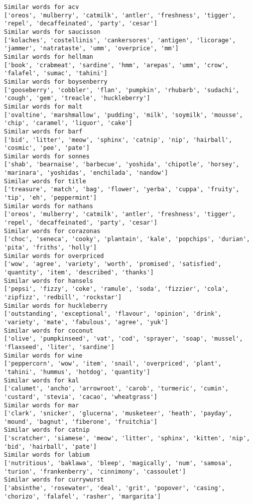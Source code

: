 \documentclass[11pt]{article}
\begin{document}
\begin{Verbatim}[commandchars=\\\{\}]
Similar words for acv
['oreos', 'mulberry', 'catmilk', 'antler', 'freshness', 'tigger', 'repel', 'decaffeinated', 'party', 'cesar']
Similar words for saucisson
['kolaches', 'costellinis', 'cankersores', 'antigen', 'licorage', 'jammer', 'natrataste', 'umm', 'overprice', 'mm']
Similar words for hellman
['book', 'crabmeat', 'sardine', 'hmm', 'arepas', 'umm', 'crow', 'falafel', 'sumac', 'tahini']
Similar words for boysenberry
['gooseberry', 'cobbler', 'flan', 'pumpkin', 'rhubarb', 'sudachi', 'cough', 'gem', 'treacle', 'huckleberry']
Similar words for malt
['ovaltine', 'marshmallow', 'pudding', 'milk', 'soymilk', 'mousse', 'chip', 'caramel', 'liquor', 'cake']
Similar words for barf
['bid', 'litter', 'meow', 'sphinx', 'catnip', 'nip', 'hairball', 'cosmic', 'pee', 'pate']
Similar words for sonnes
['shab', 'bearnaise', 'barbecue', 'yoshida', 'chipotle', 'horsey', 'marinara', 'yoshidas', 'enchilada', 'nandow']
Similar words for title
['treasure', 'match', 'bag', 'flower', 'yerba', 'cuppa', 'fruity', 'tip', 'eh', 'peppermint']
Similar words for nathans
['oreos', 'mulberry', 'catmilk', 'antler', 'freshness', 'tigger', 'repel', 'decaffeinated', 'party', 'cesar']
Similar words for corazonas
['choc', 'seneca', 'cooky', 'plantain', 'kale', 'popchips', 'durian', 'pita', 'friths', 'holly']
Similar words for overpriced
['wow', 'agree', 'variety', 'worth', 'promised', 'satisfied', 'quantity', 'item', 'described', 'thanks']
Similar words for hansels
['pepsi', 'fizzy', 'coke', 'ramule', 'soda', 'fizzier', 'cola', 'zipfizz', 'redbill', 'rockstar']
Similar words for huckleberry
['outstanding', 'exceptional', 'flavour', 'opinion', 'drink', 'variety', 'mate', 'fabulous', 'agree', 'yuk']
Similar words for coconut
['olive', 'pumpkinseed', 'vat', 'cod', 'sprayer', 'soap', 'mussel', 'flaxseed', 'liter', 'sardine']
Similar words for wine
['peppercorn', 'wow', 'item', 'snail', 'overpriced', 'plant', 'tahini', 'hummus', 'hotdog', 'quantity']
Similar words for kal
['calumet', 'ancho', 'arrowroot', 'carob', 'turmeric', 'cumin', 'custard', 'stevia', 'cacao', 'wheatgrass']
Similar words for mar
['clark', 'snicker', 'glucerna', 'musketeer', 'heath', 'payday', 'mound', 'bagnut', 'fiberone', 'fruitchia']
Similar words for catnip
['scratcher', 'siamese', 'meow', 'litter', 'sphinx', 'kitten', 'nip', 'bid', 'hairball', 'pate']
Similar words for labium
['nutritious', 'baklawa', 'bleep', 'magically', 'num', 'samosa', 'turion', 'frankenberry', 'cinnimony', 'cassoulet']
Similar words for currywurst
['absinthe', 'rosewater', 'deal', 'grit', 'popover', 'casing', 'chorizo', 'falafel', 'rasher', 'margarita']

\end{Verbatim}
\end{document}
